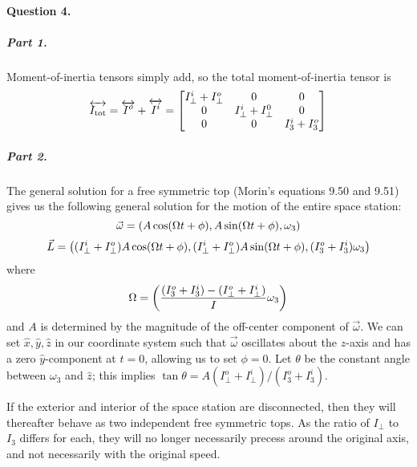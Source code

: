 \paragraph{Question 4.}

\subparagraph{Part 1.}  Moment-of-inertia tensors simply add, so the
total moment-of-inertia tensor is $$\overleftrightarrow{I_{\text{tot}}}
= \overleftrightarrow{I^o} + \overleftrightarrow{I^i} =
\begin{bmatrix}
I_\bot^i + I_\bot^o & 0 & 0 \\
0 & I_\bot^i + I_\bot^0 & 0 \\
0 & 0 & I_3^i + I_3^o
\end{bmatrix}$$

\subparagraph{Part 2.}  The general solution for a free symmetric top
(Morin's equations 9.50 and 9.51) gives us the following general solution for
the motion of the entire space station: $$\vec{\omega}
= \left(A \cos (\Omega t + \phi), A \sin (\Omega t
+ \phi), \omega_3 \right)$$ $$\vec{L} = \left((I_\bot^i + I_\bot^o) A \cos
(\Omega t + \phi), (I_\bot^i + I_\bot^o) A \sin (\Omega t + \phi),
(I_3^o + I_3^i) \omega_3 \right)$$ where $$\Omega = \left(\frac{(I_3^o + I_3^i) -
(I_\bot^o + I_\bot^i)}{I} \omega_3 \right)$$ and $A$ is determined by the
magnitude of the off-center component of $\vec{\omega}$.  We can set
$\hat{x}, \hat{y}, \hat{z}$ in our coordinate system such that
$\vec{\omega}$ oscillates about the $z$-axis and has a zero
$\hat{y}$-component at $t=0$, allowing us to set $\phi = 0$.  Let $\theta$
be the constant angle between $\omega_3$ and $\hat{z}$; this implies
$\tan \theta = A (I_\bot^o + I_\bot^i)/(I_3^o + I_3^i)$.

If the exterior and interior of the space station are disconnected,
then they will thereafter behave as two independent free symmetric
tops.  As the ratio of $I_\bot$ to $I_3$ differs for each, they will
no longer necessarily precess around the original axis, and not
necessarily with the original speed.


